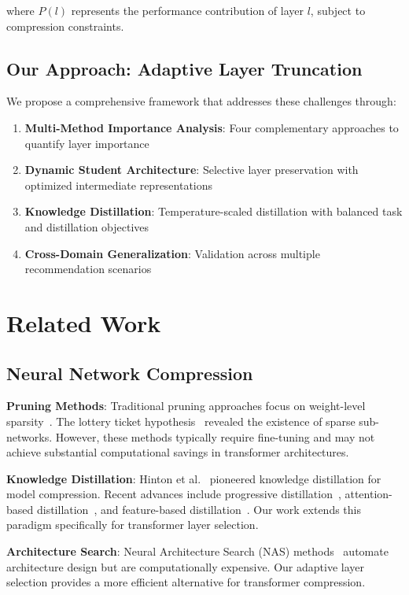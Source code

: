 \documentclass[sigconf]{acmart}
\begin{document}
where $P(l)$ represents the performance contribution of layer $l$, subject to compression constraints.

\subsection{Our Approach: Adaptive Layer Truncation}

We propose a comprehensive framework that addresses these challenges through:

\begin{enumerate}
\item \textbf{Multi-Method Importance Analysis}: Four complementary approaches to quantify layer importance
\item \textbf{Dynamic Student Architecture}: Selective layer preservation with optimized intermediate representations
\item \textbf{Knowledge Distillation}: Temperature-scaled distillation with balanced task and distillation objectives
\item \textbf{Cross-Domain Generalization}: Validation across multiple recommendation scenarios
\end{enumerate}

\section{Related Work}

\subsection{Neural Network Compression}

\textbf{Pruning Methods}: Traditional pruning approaches focus on weight-level sparsity~\cite{han2015learning}. The lottery ticket hypothesis~\cite{frankle2018lottery} revealed the existence of sparse sub-networks. However, these methods typically require fine-tuning and may not achieve substantial computational savings in transformer architectures.

\textbf{Knowledge Distillation}: Hinton et al.~\cite{hinton2015distilling} pioneered knowledge distillation for model compression. Recent advances include progressive distillation~\cite{romero2014fitnets}, attention-based distillation~\cite{zagoruyko2016paying}, and feature-based distillation~\cite{yim2017gift}. Our work extends this paradigm specifically for transformer layer selection.

\textbf{Architecture Search}: Neural Architecture Search (NAS) methods~\cite{zoph2016neural,pham2018efficient} automate architecture design but are computationally expensive. Our adaptive layer selection provides a more efficient alternative for transformer compression.
\end{document}
